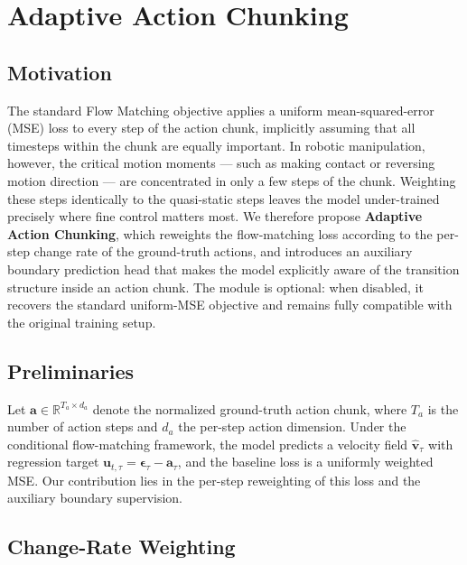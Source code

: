 
\section{Adaptive Action Chunking}
\label{sec:adaptive_chunking}

\subsection{Motivation}

The standard Flow Matching objective applies a uniform mean-squared-error (MSE) loss to
every step of the action chunk, implicitly assuming that all timesteps within the chunk
are equally important. In robotic manipulation, however, the critical motion moments ---
such as making contact or reversing motion direction --- are concentrated in only a few
steps of the chunk. Weighting these steps identically to the quasi-static steps leaves
the model under-trained precisely where fine control matters most. We therefore propose
\textbf{Adaptive Action Chunking}, which reweights the flow-matching loss according to
the per-step change rate of the ground-truth actions, and introduces an auxiliary
boundary prediction head that makes the model explicitly aware of the transition
structure inside an action chunk. The module is optional: when disabled, it recovers the
standard uniform-MSE objective and remains fully compatible with the original training
setup.

\subsection{Preliminaries}

Let $\mathbf{a} \in \mathbb{R}^{T_a \times d_a}$ denote the normalized ground-truth action
chunk, where $T_a$ is the number of action steps and $d_a$ the per-step action dimension.
Under the conditional flow-matching framework, the model predicts a velocity field
$\hat{\mathbf{v}}_\tau$ with regression target
$\mathbf{u}_{t,\tau} = \boldsymbol{\epsilon}_\tau - \mathbf{a}_\tau$, and the baseline loss
is a uniformly weighted MSE. Our contribution lies in the per-step reweighting of this
loss and the auxiliary boundary supervision.

\subsection{Change-Rate Weighting}

